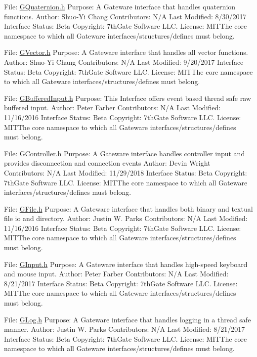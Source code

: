 File\+: \mbox{\hyperlink{GQuaternion_8h_source}{G\+Quaternion.\+h}} Purpose\+: A Gateware interface that handles quaternion functions. Author\+: Shuo-\/\+Yi Chang Contributors\+: N/A Last Modified\+: 8/30/2017 Interface Status\+: Beta Copyright\+: 7th\+Gate Software L\+LC. License\+: M\+I\+T\+The core namespace to which all Gateware interfaces/structures/defines must belong.

File\+: \mbox{\hyperlink{GVector_8h_source}{G\+Vector.\+h}} Purpose\+: A Gateware interface that handles all vector functions. Author\+: Shuo-\/\+Yi Chang Contributors\+: N/A Last Modified\+: 9/20/2017 Interface Status\+: Beta Copyright\+: 7th\+Gate Software L\+LC. License\+: M\+I\+T\+The core namespace to which all Gateware interfaces/structures/defines must belong.

File\+: \mbox{\hyperlink{GBufferedInput_8h_source}{G\+Buffered\+Input.\+h}} Purpose\+: This Interface offers event based thread safe raw buffered input. Author\+: Peter Farber Contributors\+: N/A Last Modified\+: 11/16/2016 Interface Status\+: Beta Copyright\+: 7th\+Gate Software L\+LC. License\+: M\+I\+T\+The core namespace to which all Gateware interfaces/structures/defines must belong.

File\+: \mbox{\hyperlink{GController_8h_source}{G\+Controller.\+h}} Purpose\+: A Gateware interface handles controller input and provides disconnection and connection events Author\+: Devin Wright Contributors\+: N/A Last Modified\+: 11/29/2018 Interface Status\+: Beta Copyright\+: 7th\+Gate Software L\+LC. License\+: M\+I\+T\+The core namespace to which all Gateware interfaces/structures/defines must belong.

File\+: \mbox{\hyperlink{GFile_8h_source}{G\+File.\+h}} Purpose\+: A Gateware interface that handles both binary and textual file io and directory. Author\+: Justin W. Parks Contributors\+: N/A Last Modified\+: 11/16/2016 Interface Status\+: Beta Copyright\+: 7th\+Gate Software L\+LC. License\+: M\+I\+T\+The core namespace to which all Gateware interfaces/structures/defines must belong.

File\+: \mbox{\hyperlink{GInput_8h_source}{G\+Input.\+h}} Purpose\+: A Gateware interface that handles high-\/speed keyboard and mouse input. Author\+: Peter Farber Contributors\+: N/A Last Modified\+: 8/21/2017 Interface Status\+: Beta Copyright\+: 7th\+Gate Software L\+LC. License\+: M\+I\+T\+The core namespace to which all Gateware interfaces/structures/defines must belong.

File\+: \mbox{\hyperlink{GLog_8h_source}{G\+Log.\+h}} Purpose\+: A Gateware interface that handles logging in a thread safe manner. Author\+: Justin W. Parks Contributors\+: N/A Last Modified\+: 8/21/2017 Interface Status\+: Beta Copyright\+: 7th\+Gate Software L\+LC. License\+: M\+I\+T\+The core namespace to which all Gateware interfaces/structures/defines must belong.

